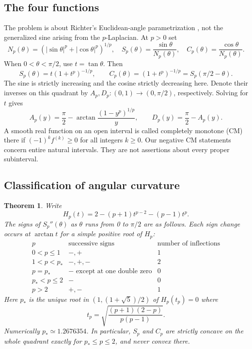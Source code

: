 \documentclass[11pt,a4paper]{article}
\numberwithin{equation}{section}
\newtheorem{theorem}{Theorem}[section]
\theoremstyle{definition}
\theoremstyle{remark}
\begin{document}
\subsection{The four functions}
The problem is about Richter's Euclidean-angle parametrization \cite{r42heisei:richt,r42heisei:yhl}, not the generalized sine arising from the $p$-Laplacian. At $p>0$ set
\[
 N_p(\theta)=(|\sin\theta|^p+|\cos\theta|^p)^{1/p},\quad
 S_p(\theta)=\frac{\sin\theta}{N_p(\theta)},\quad
 C_p(\theta)=\frac{\cos\theta}{N_p(\theta)}.
\]
When $0<\theta<\pi/2$, use $t=\tan\theta$. Then
\[
 S_p(\theta)=t(1+t^p)^{-1/p},\qquad
 C_p(\theta)=(1+t^p)^{-1/p}=S_p(\pi/2-\theta).
\]
The sine is strictly increasing and the cosine strictly decreasing here. Denote their inverses on this quadrant by $A_p,D_p:(0,1)\to(0,\pi/2)$, respectively. Solving for $t$ gives
\begin{equation}\label{r42heisei:inv}
 A_p(y)=\frac\pi2-\arctan\frac{(1-y^p)^{1/p}}y,\qquad
 D_p(y)=\frac\pi2-A_p(y).
\end{equation}
A smooth real function on an open interval is called completely monotone (CM) there if $(-1)^kf^{(k)}\ge0$ for all integers $k\ge0$. Our negative CM statements concern entire natural intervals. They are not assertions about every proper subinterval.

\subsection{Classification of angular curvature}
\begin{theorem}\label{r42heisei:th}
Write
\[
 H_p(t)=2-(p+1)t^{p-2}-(p-1)t^p.
\]
The signs of $S_p''(\theta)$ as $\theta$ runs from 0 to $\pi/2$ are as follows. Each sign change occurs at $\arctan t$ for a simple positive root of $H_p$:
\[
\begin{array}{c|c|c}
 p & \text{successive signs} & \text{number of inflections}\\ \hline
 0<p\le1 & -,+ & 1\\
 1<p<p_* & -,+,- & 2\\
 p=p_* & -\text{ except at one double zero} & 0\\
 p_*<p\le2 & - & 0\\
 p>2 & +,- & 1
\end{array}
\]
Here $p_*$ is the unique root in $(1,(1+\sqrt5)/2)$ of $H_p(t_p)=0$ where
\[
 t_p=\sqrt{\frac{(p+1)(2-p)}{p(p-1)}}.
\]
Numerically $p_*\simeq1.2676354$. In particular, $S_p$ and $C_p$ are strictly concave on the whole quadrant exactly for $p_*\le p\le2$, and never convex there.
\end{theorem}
\end{document}
